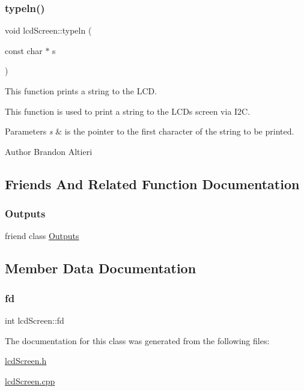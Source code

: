 \subsubsection{\texorpdfstring{typeln()}{typeln()}}
{\footnotesize\ttfamily void lcd\+Screen\+::typeln (\begin{DoxyParamCaption}\item[{const char $\ast$}]{s }\end{DoxyParamCaption})\hspace{0.3cm}{\ttfamily [private]}}



This function prints a string to the L\+CD. 

This function is used to print a string to the L\+CD\textquotesingle{}s screen via I2C.


\begin{DoxyParams}{Parameters}
{\em s} & is the pointer to the first character of the string to be printed. \\
\hline
\end{DoxyParams}
\begin{DoxyAuthor}{Author}
Brandon Altieri 
\end{DoxyAuthor}


\subsection{Friends And Related Function Documentation}
\mbox{\label{classlcdScreen_af99d17c01d4ce8459247f8043b2de102}} 
\subsubsection{\texorpdfstring{Outputs}{Outputs}}
{\footnotesize\ttfamily friend class \hyperlink{classOutputs}{Outputs}\hspace{0.3cm}{\ttfamily [friend]}}



\subsection{Member Data Documentation}
\mbox{\label{classlcdScreen_a1810308c22efd469be71020079c05d2c}} 
\subsubsection{\texorpdfstring{fd}{fd}}
{\footnotesize\ttfamily int lcd\+Screen\+::fd\hspace{0.3cm}{\ttfamily [private]}}



The documentation for this class was generated from the following files\+:\begin{DoxyCompactItemize}
\item 
\hyperlink{lcdScreen_8h}{lcd\+Screen.\+h}\item 
\hyperlink{lcdScreen_8cpp}{lcd\+Screen.\+cpp}\end{DoxyCompactItemize}
